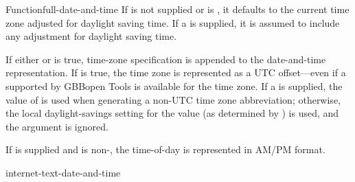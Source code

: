 \documentclass[10pt,twoside,english,pdftex]{article}
\begin{document}
\begin{functiondoc}{Function}{full-date-and-time}
\W{} 
%
If  is not supplied or is \nil, it defaults to the current
time zone adjusted for daylight saving time. If a  is
supplied, it is assumed to include any adjustment for daylight saving time.

\W{} 
%
If either  or  is true,
time-zone specification is appended to the date-and-time representation.  If
 is true, the time zone is represented as a UTC
offset---even if a  supported by
GBBopen Tools is available for the time zone.  If a 
is supplied, the value of  is used when
generating a non-UTC time zone abbreviation; otherwise, the local
daylight-savings setting for the  value (as
determined by ) is used, and the
 argument is ignored.

\W{} 
%
If  is supplied and is non-\nil, the time-of-day is represented
in AM/PM format.

\begin{alsos}{internet-text-date-and-time}
\end{alsos}


\end{functiondoc}
\end{document}
